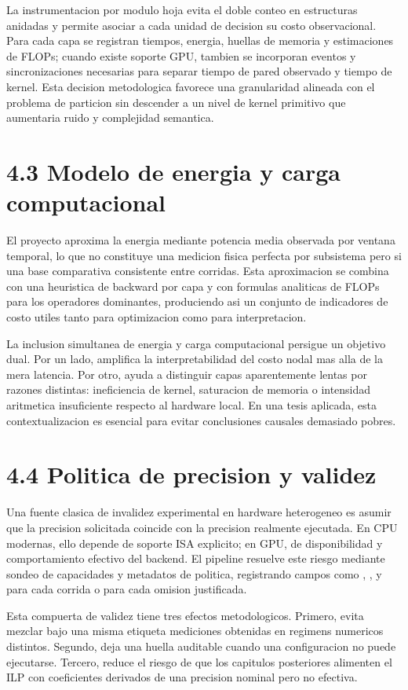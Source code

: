 La instrumentacion por modulo hoja evita el doble conteo en estructuras anidadas y permite asociar a cada unidad de decision su costo observacional. Para cada capa se registran tiempos, energia, huellas de memoria y estimaciones de FLOPs; cuando existe soporte GPU, tambien se incorporan eventos y sincronizaciones necesarias para separar tiempo de pared observado y tiempo de kernel. Esta decision metodologica favorece una granularidad alineada con el problema de particion sin descender a un nivel de kernel primitivo que aumentaria ruido y complejidad semantica.

\section{4.3 Modelo de energia y carga computacional}
El proyecto aproxima la energia mediante potencia media observada por ventana temporal, lo que no constituye una medicion fisica perfecta por subsistema pero si una base comparativa consistente entre corridas. Esta aproximacion se combina con una heuristica de backward por capa y con formulas analiticas de FLOPs para los operadores dominantes, produciendo asi un conjunto de indicadores de costo utiles tanto para optimizacion como para interpretacion.

La inclusion simultanea de energia y carga computacional persigue un objetivo dual. Por un lado, amplifica la interpretabilidad del costo nodal mas alla de la mera latencia. Por otro, ayuda a distinguir capas aparentemente lentas por razones distintas: ineficiencia de kernel, saturacion de memoria o intensidad aritmetica insuficiente respecto al hardware local. En una tesis aplicada, esta contextualizacion es esencial para evitar conclusiones causales demasiado pobres.

\section{4.4 Politica de precision y validez}
Una fuente clasica de invalidez experimental en hardware heterogeneo es asumir que la precision solicitada coincide con la precision realmente ejecutada. En CPU modernas, ello depende de soporte ISA explicito; en GPU, de disponibilidad y comportamiento efectivo del backend. El pipeline resuelve este riesgo mediante sondeo de capacidades y metadatos de politica, registrando campos como , ,  y  para cada corrida o para cada omision justificada.

Esta compuerta de validez tiene tres efectos metodologicos. Primero, evita mezclar bajo una misma etiqueta mediciones obtenidas en regimens numericos distintos. Segundo, deja una huella auditable cuando una configuracion no puede ejecutarse. Tercero, reduce el riesgo de que los capitulos posteriores alimenten el ILP con coeficientes derivados de una precision nominal pero no efectiva.

